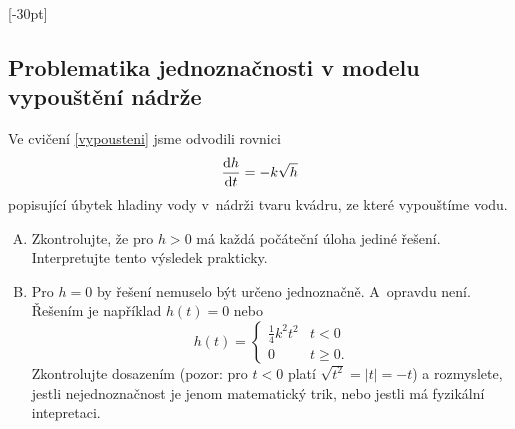 \konec

\stranka
{}[-30pt]


\subsection{Problematika jednoznačnosti v modelu vypouštění nádrže}

Ve cvičení \ref{vypousteni}  jsme odvodili rovnici
$$\frac{\mathrm{d}h}{\mathrm{d}t}=-k\sqrt h$$
popisující úbytek hladiny vody v nádrži tvaru kvádru, ze které vypouštíme vodu.
\begin{enumerate}[A)]
\item Zkontrolujte, že pro $h>0$ má každá počáteční úloha jediné řešení. Interpretujte tento výsledek prakticky.
\item Pro $h=0$ by řešení nemuselo být určeno jednoznačně. A opravdu
  není. Řešením je například $h(t)=0$ nebo $$h(t)=
  \begin{cases}
    \frac 14 k^2 t^2 & t<0\\
    0 & t\geq 0.
  \end{cases}
  $$
Zkontrolujte dosazením (pozor: pro $t<0$ platí $\sqrt {t^2}=|t|=-t$) a rozmyslete, jestli nejednoznačnost je jenom matematický trik, nebo jestli má
 fyzikální intepretaci.
\end{enumerate}


